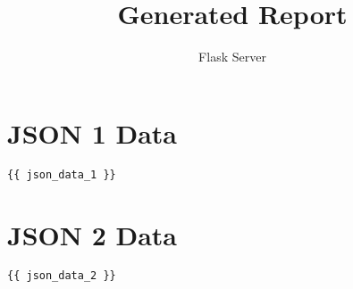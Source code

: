 \documentclass{article}
\title{Generated Report}
\author{Flask Server}
\begin{document}
\maketitle

\section*{JSON 1 Data}
\begin{verbatim}
{{ json_data_1 }}
\end{verbatim}

\section*{JSON 2 Data}
\begin{verbatim}
{{ json_data_2 }}
\end{verbatim}
\end{document}
